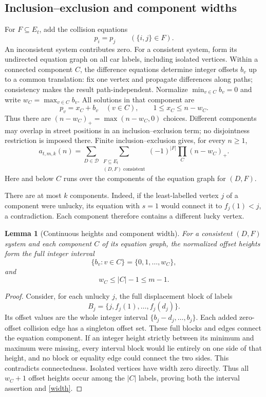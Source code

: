 \documentclass[11pt]{article}
\newtheorem{lemma}{Lemma}
\theoremstyle{definition}
\newcommand{\D}{\mathcal D}
\begin{document}
\subsection{Inclusion--exclusion and component widths}
For $F\subseteq E_t$, add the collision equations
\begin{equation}\label{collisions}
 p_i=p_j\qquad(\{i,j\}\in F).
\end{equation}
An inconsistent system contributes zero. For a consistent system, form its undirected equation graph on all car labels, including isolated vertices. Within a connected component $C$, the difference equations determine integer offsets $b_v$ up to a common translation: fix one vertex and propagate differences along paths; consistency makes the result path-independent. Normalize $\min_{v\in C}b_v=0$ and write $w_C=\max_{v\in C}b_v$. All solutions in that component are
\[
 p_v=x_C+b_v\quad(v\in C),\qquad 1\le x_C\le n-w_C.
\]
Thus there are $(n-w_C)_+=\max(n-w_C,0)$ choices. Different components may overlap in street positions in an inclusion--exclusion term; no disjointness restriction is imposed there. Finite inclusion--exclusion gives, for every $n\ge1$,
\begin{equation}\label{IE}
 a_{t,m,k}(n)=\sum_{D\in\D}
 \sum_{\substack{F\subseteq E_t\\(D,F)\text{ consistent}}}
 (-1)^{|F|}\prod_C(n-w_C)_+.
\end{equation}
Here and below $C$ runs over the components of the equation graph for $(D,F)$.

There are at most $k$ components. Indeed, if the least-labelled vertex $j$ of a component were unlucky, its equation with $s=1$ would connect it to $f_j(1)<j$, a contradiction. Each component therefore contains a different lucky vertex.

\begin{lemma}[Continuous heights and component width]\label{continuous-heights}
For a consistent $(D,F)$ system and each component $C$ of its equation graph, the normalized offset heights form the full integer interval
\[
 \{b_v:v\in C\}=\{0,1,\ldots,w_C\},
\]
and
\begin{equation}\label{width}
 w_C\le |C|-1\le m-1.
\end{equation}
\end{lemma}
\begin{proof}
Consider, for each unlucky $j$, the full displacement block of labels
\[
 B_j=\{j,f_j(1),\ldots,f_j(d_j)\}.
\]
Its offset values are the whole integer interval $\{b_j-d_j,\ldots,b_j\}$. Each added zero-offset collision edge has a singleton offset set. These full blocks and edges connect the equation component. If an integer height strictly between its minimum and maximum were missing, every interval block would lie entirely on one side of that height, and no block or equality edge could connect the two sides. This contradicts connectedness. Isolated vertices have width zero directly. Thus all $w_C+1$ offset heights occur among the $|C|$ labels, proving both the interval assertion and \eqref{width}.
\end{proof}
\end{document}
